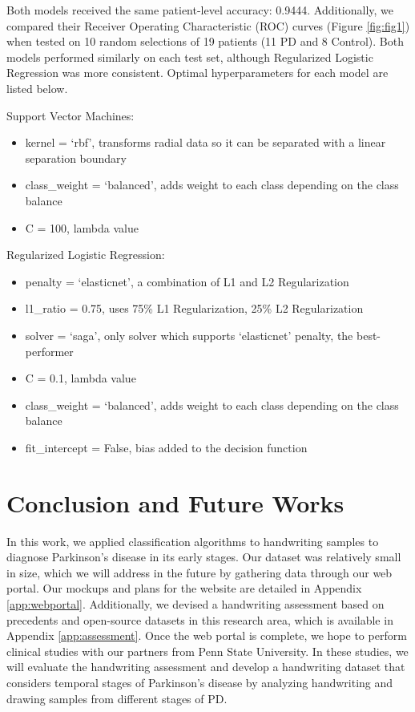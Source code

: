 \documentclass[pmlr,twocolumn,10pt]{jmlr} %
\begin{document}
Both models received the same patient-level accuracy: 0.9444. Additionally, we compared their Receiver Operating Characteristic (ROC) curves (Figure \ref{fig:fig1}) when tested on 10 random selections of 19 patients (11 PD and 8 Control). Both models performed similarly on each test set, although Regularized Logistic Regression was more consistent. Optimal hyperparameters for each model are listed below.

Support Vector Machines:
\begin{itemize}
\item kernel = ‘rbf’, transforms radial data so it can be separated with a linear separation boundary
\item class\_weight = ‘balanced’, adds weight to each class depending on the class balance
\item C = 100, lambda value
\end{itemize}

Regularized Logistic Regression:
\begin{itemize}
\item penalty = ‘elasticnet’, a combination of L1 and L2 Regularization
\item l1\_ratio = 0.75, uses 75\% L1 Regularization, 25\% L2 Regularization
\item solver = ‘saga’, only solver which supports ‘elasticnet’ penalty, the best-performer
\item C = 0.1, lambda value
\item class\_weight = ‘balanced’, adds weight to each class depending on the class balance
\item fit\_intercept = False, bias added to the decision function
\end{itemize}

\section{Conclusion and Future Works}
\label{Conclusion+FutureWorks} 
In this work, we applied classification algorithms to handwriting samples to diagnose Parkinson's disease in its early stages. Our dataset was relatively small in size, which we will address in the future by gathering data through our web portal. Our mockups and plans for the website are detailed in Appendix \ref{app:webportal}.  Additionally, we devised a handwriting assessment based on precedents and open-source datasets in this research area, which is available in Appendix \ref{app:assessment}. Once the web portal is complete, we hope to perform clinical studies with our partners from Penn State University. In these studies, we will evaluate the handwriting assessment and develop a handwriting dataset that considers temporal stages of Parkinson’s disease by analyzing handwriting and drawing samples from different stages of PD. 
\end{document}
